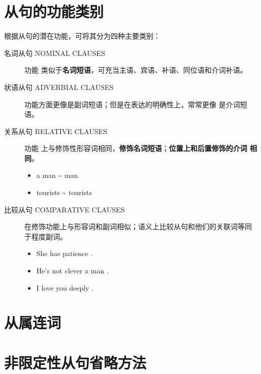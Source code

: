 \section{从句的功能类别}

根据从句的潜在功能，可将其分为四种主要类别：
\begin{description}
\item[名词从句 NOMINAL CLAUSES]  功能
  类似于\textbf{名词短语}，可充当主语、宾语、补语、同位语和介词补语。

\item[状语从句 ADVERBIAL CLAUSES]  功能方面更像是副词短语；但是在表达的明确性上，常常更像
  是介词短语。

\item[关系从句 RELATIVE CLAUSES]  功能
  上与修饰性形容词相同，\textbf{修饰名词短语}；\textbf{位置上和后置修饰的介词
    相同}。
  \begin{itemize}
  \item a man  \~{}  man
  \item tourists  \~{} tourists 
  \end{itemize}

\item[比较从句 COMPARATIVE CLAUSES]  在修饰功能上与形容词和副词相似；语义上比较从句和他们的关联词等同
  于程度副词。
  \begin{itemize}
  \item She has  patience .
  \item He's not  clever a man .
  \item I love you  deeply .
  \end{itemize}
\end{description}

\section{从属连词}
\label{subsec:subcon}


\section{非限定性从句省略方法}


